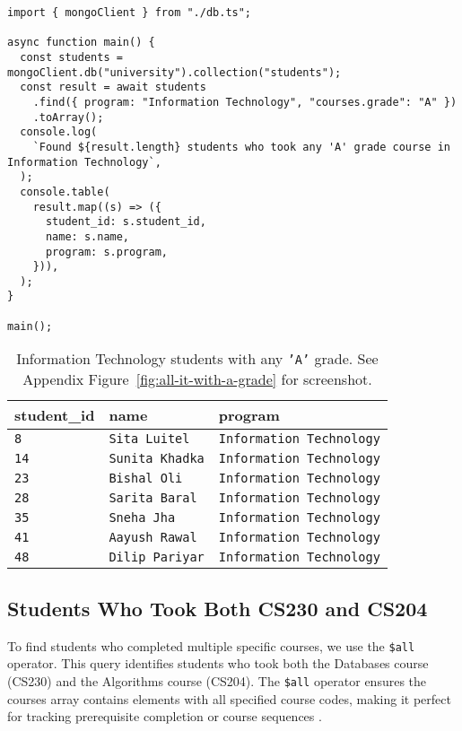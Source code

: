 \begin{verbatim}
import { mongoClient } from "./db.ts";

async function main() {
  const students = mongoClient.db("university").collection("students");
  const result = await students
    .find({ program: "Information Technology", "courses.grade": "A" })
    .toArray();
  console.log(
    `Found ${result.length} students who took any 'A' grade course in Information Technology`,
  );
  console.table(
    result.map((s) => ({
      student_id: s.student_id,
      name: s.name,
      program: s.program,
    })),
  );
}

main();
\end{verbatim}

\begin{table}[H]
  \centering
  \begin{tabular}{|l|l|l|}
    \hline
    \textbf{student\_id} & \textbf{name} & \textbf{program} \\
    \hline
    \texttt{8} & \texttt{Sita Luitel} & \texttt{Information Technology} \\
    \texttt{14} & \texttt{Sunita Khadka} & \texttt{Information Technology} \\
    \texttt{23} & \texttt{Bishal Oli} & \texttt{Information Technology} \\
    \texttt{28} & \texttt{Sarita Baral} & \texttt{Information Technology} \\
    \texttt{35} & \texttt{Sneha Jha} & \texttt{Information Technology} \\
    \texttt{41} & \texttt{Aayush Rawal} & \texttt{Information Technology} \\
    \texttt{48} & \texttt{Dilip Pariyar} & \texttt{Information Technology} \\
    \hline
  \end{tabular}
      \caption{Information Technology students with any \texttt{'A'} grade. See Appendix Figure~\ref{fig:all-it-with-a-grade} for screenshot.}
\end{table}

\subsection{Students Who Took Both CS230 and CS204}
To find students who completed multiple specific courses, we use the \texttt{\$all} operator. This query identifies students who took both the Databases course (CS230) and the Algorithms course (CS204). The \texttt{\$all} operator ensures the courses array contains elements with all specified course codes, making it perfect for tracking prerequisite completion or course sequences \parencite{mongodb_architecture}.


